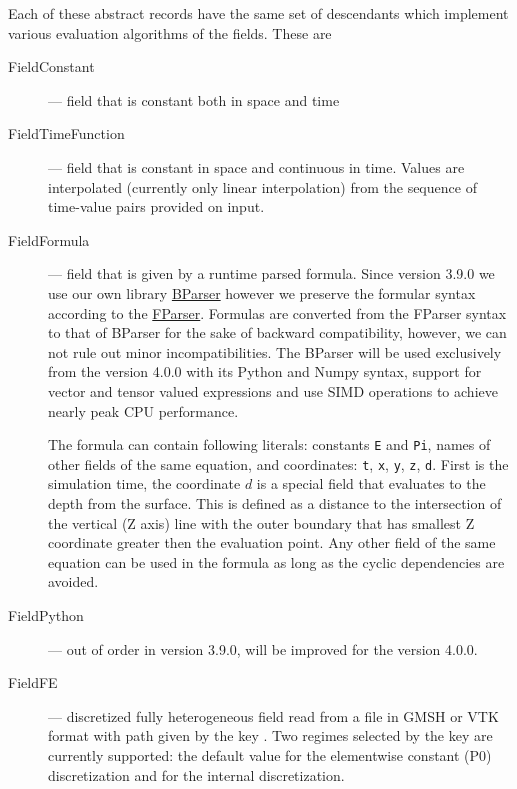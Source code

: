 Each of these abstract records have the same set of descendants which implement various evaluation algorithms of the fields. These are
\begin{description}
 \item[FieldConstant] --- field that is constant both in space and time
 \item[FieldTimeFunction] --- field that is constant in space and continuous in time. Values are interpolated (currently only linear interpolation) from 
 the sequence of time-value pairs provided on input.
 \item[FieldFormula] --- field that is given by a runtime parsed formula. %
Since version 3.9.0 we use our own library \href{https://github.com/flow123d/bparser}{BParser} however 
we preserve the formular syntax according to the \href{http://warp.povusers.org/FunctionParser/fparser.html}{FParser}.
Formulas are converted from the FParser syntax to that of BParser for the sake of backward compatibility,
however, we can not rule out minor incompatibilities. The BParser will be used exclusively from the version
4.0.0 with its Python and Numpy syntax, support for vector and tensor valued expressions and use SIMD
operations to achieve nearly peak CPU performance. 
 
The formula can contain following literals: constants {\tt E} and {\tt Pi}, names of other fields of the same equation, 
and coordinates: {\tt t}, {\tt x}, {\tt y}, {\tt z}, {\tt d}. First is the 
simulation time, the coordinate $d$ is a special field that evaluates to the depth from the surface. This is 
defined as a distance to the intersection of the vertical (Z axis) line with the outer boundary that has smallest 
Z coordinate greater then the evaluation point. Any other field of the same equation can be used 
in the formula as long as the cyclic dependencies are avoided. 

 \item[FieldPython] --- out of order in version 3.9.0, will be improved for the version 4.0.0.
 \item[FieldFE] --- discretized fully heterogeneous field  read from a file in GMSH or VTK format with path given by 
 the key . Two regimes selected by the key 
  are currently supported: 
 the default value  
 for the elementwise constant (P0) discretization and 
 for the internal discretization. 
 

\end{description}
